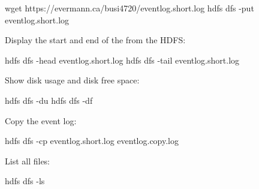 \begin{samepage}
\begin{bashcode}
wget https://evermann.ca/busi4720/eventlog.short.log
hdfs dfs -put eventlog.short.log
\end{bashcode}
\end{samepage}

Display the start and end of the from the HDFS:
\begin{samepage}
\begin{bashcode}
hdfs dfs -head eventlog.short.log
hdfs dfs -tail eventlog.short.log
\end{bashcode}
\end{samepage}

Show disk usage and disk free space:
\begin{samepage}
\begin{bashcode}
hdfs dfs -du
hdfs dfs -df
\end{bashcode}
\end{samepage}

Copy the event log:
\begin{bashcode}
hdfs dfs -cp eventlog.short.log eventlog.copy.log
\end{bashcode}

List all files:
\begin{bashcode}
hdfs dfs -ls
\end{bashcode}


